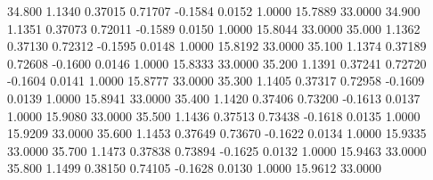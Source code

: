   34.800   1.1340   0.37015   0.71707  -0.1584   0.0152   1.0000  15.7889  33.0000
  34.900   1.1351   0.37073   0.72011  -0.1589   0.0150   1.0000  15.8044  33.0000
  35.000   1.1362   0.37130   0.72312  -0.1595   0.0148   1.0000  15.8192  33.0000
  35.100   1.1374   0.37189   0.72608  -0.1600   0.0146   1.0000  15.8333  33.0000
  35.200   1.1391   0.37241   0.72720  -0.1604   0.0141   1.0000  15.8777  33.0000
  35.300   1.1405   0.37317   0.72958  -0.1609   0.0139   1.0000  15.8941  33.0000
  35.400   1.1420   0.37406   0.73200  -0.1613   0.0137   1.0000  15.9080  33.0000
  35.500   1.1436   0.37513   0.73438  -0.1618   0.0135   1.0000  15.9209  33.0000
  35.600   1.1453   0.37649   0.73670  -0.1622   0.0134   1.0000  15.9335  33.0000
  35.700   1.1473   0.37838   0.73894  -0.1625   0.0132   1.0000  15.9463  33.0000
  35.800   1.1499   0.38150   0.74105  -0.1628   0.0130   1.0000  15.9612  33.0000
